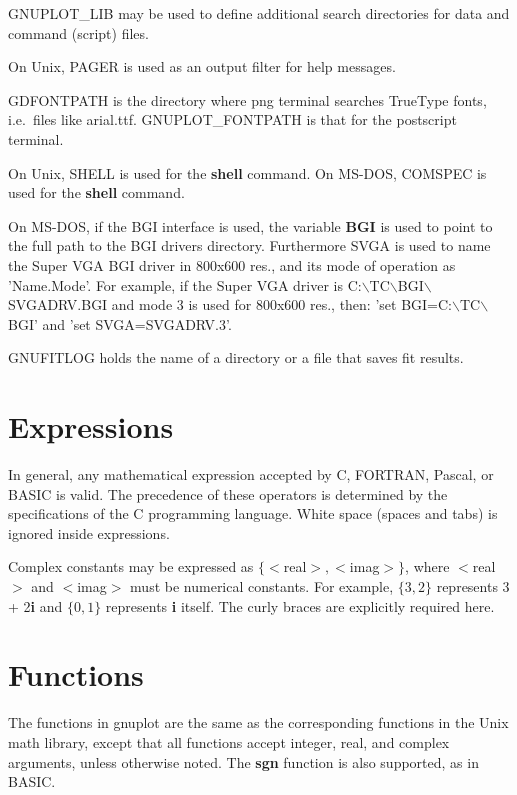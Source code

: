 GNUPLOT\_LIB may be used to define additional search directories for
data and command (script) files.

On Unix, PAGER is used as an output filter for help messages.

GDFONTPATH is the directory where png terminal searches TrueType fonts, 
i.e.~files like arial.ttf.
GNUPLOT\_FONTPATH is that for the postscript terminal.

On Unix, SHELL is used for the {\bf shell} command. On MS-DOS,
COMSPEC is used for the {\bf shell} command.

On MS-DOS, if the BGI interface is used, the variable {\bf BGI} is used to point
to the full path to the BGI drivers directory. Furthermore SVGA is used to
name the Super VGA BGI driver in 800x600 res., and its mode of operation
as 'Name.Mode'.
For example, if the Super VGA driver is 
C:$\backslash$TC$\backslash$BGI$\backslash$SVGADRV.BGI
and mode 3 is used for 800x600 res., then: 
'set BGI=C:$\backslash$TC$\backslash$BGI' and 'set SVGA=SVGADRV.3'.

GNUFITLOG holds the name of a directory or a file that saves fit results.


\section{Expressions}
In general, any mathematical expression accepted by C, FORTRAN,
Pascal, or BASIC is valid. The precedence of these operators is
determined by the specifications of the C programming language.
White space (spaces and tabs) is ignored inside expressions.

Complex constants may be expressed as $\{<$real$>,<$imag$>\}$, where
$<$real$>$ and $<$imag$>$ must be numerical constants.  For example,
$\{3,2\}$ represents 3 + 2{\bf i} and $\{0,1\}$ represents {\bf i}
itself.  The curly braces are explicitly required here.
\section{Functions}
The functions in gnuplot are the same as the corresponding functions
in the Unix math library, except that all functions accept integer,
real, and complex arguments, unless otherwise noted. The {\bf sgn}
function is also supported, as in BASIC.

